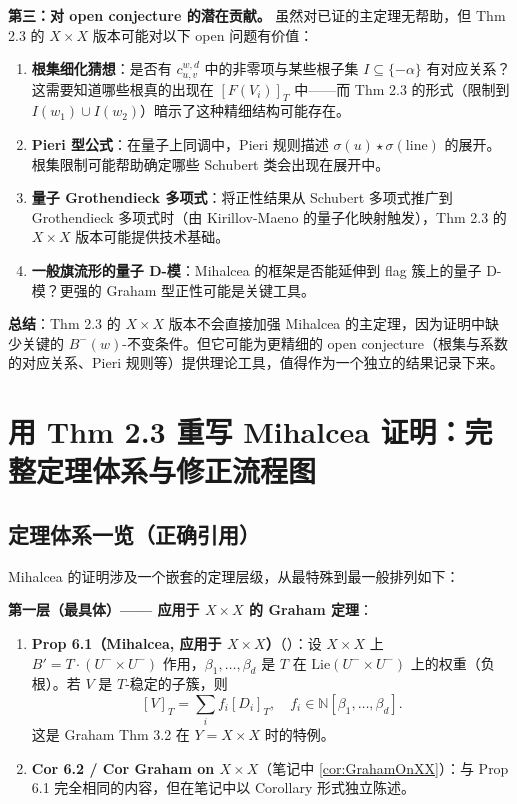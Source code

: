 \textbf{第三：对 open conjecture 的潜在贡献。} 虽然对已证的主定理无帮助，但 Thm 2.3 的 $X \times X$ 版本可能对以下 open 问题有价值：
\begin{enumerate}
\item \textbf{根集细化猜想}：是否有 $c_{u,v}^{w,d}$ 中的非零项与某些根子集 $I \subseteq \{-\alpha\}$ 有对应关系？这需要知道哪些根真的出现在 $[F(V_i)]_T$ 中——而 Thm 2.3 的形式（限制到 $I(w_1)\cup I(w_2)$）暗示了这种精细结构可能存在。
\item \textbf{Pieri 型公式}：在量子上同调中，Pieri 规则描述 $\sigma(u) \star \sigma(\text{line})$ 的展开。根集限制可能帮助确定哪些 Schubert 类会出现在展开中。
\item \textbf{量子 Grothendieck 多项式}：将正性结果从 Schubert 多项式推广到 Grothendieck 多项式时（由 Kirillov-Maeno 的量子化映射触发），Thm 2.3 的 $X \times X$ 版本可能提供技术基础。
\item \textbf{一般旗流形的量子 D-模}：Mihalcea 的框架是否能延伸到 flag 簇上的量子 D-模？更强的 Graham 型正性可能是关键工具。
\end{enumerate}

\textbf{总结}：Thm 2.3 的 $X \times X$ 版本不会直接加强 Mihalcea 的主定理，因为证明中缺少关键的 $B^-(w)$-不变条件。但它可能为更精细的 open conjecture（根集与系数的对应关系、Pieri 规则等）提供理论工具，值得作为一个独立的结果记录下来。

\section{用 \cite{GX2025} Thm 2.3 重写 Mihalcea 证明：完整定理体系与修正流程图}
\subsection{定理体系一览（正确引用）}

Mihalcea 的证明涉及一个嵌套的定理层级，从最特殊到最一般排列如下：

\textbf{第一层（最具体）—— 应用于 $X \times X$ 的 Graham 定理}：

\begin{enumerate}
\item \textbf{Prop 6.1（Mihalcea, 应用于 $X \times X$）}（\cite[Corollary 6.2]{Mihalcea}）：设 $X \times X$ 上 $B' = T \cdot (U^- \times U^-)$ 作用，$\beta_1,\ldots,\beta_d$ 是 $T$ 在 $\mathrm{Lie}(U^- \times U^-)$ 上的权重（负根）。若 $V$ 是 $T$-稳定的子簇，则
$$[V]_T = \sum_i f_i [D_i]_T, \quad f_i \in \mathbb{N}[\beta_1,\ldots,\beta_d].$$
这是 Graham Thm 3.2 在 $Y = X \times X$ 时的特例。

\item \textbf{Cor 6.2 / Cor Graham on $X \times X$}（笔记中 \cref{cor:GrahamOnXX}）：与 Prop 6.1 完全相同的内容，但在笔记中以 Corollary 形式独立陈述。
\end{enumerate}

